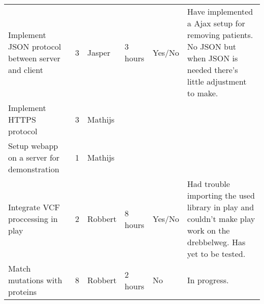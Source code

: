 \documentclass[a4paper]{report}
\begin{document}
\begin{landscape}
\begin{longtable}{p{6cm}|l|l|l|p{2cm}|p{7cm}}
Implement JSON protocol between server and client & 3 & Jasper & 3 hours & Yes/No & Have implemented a Ajax setup for removing patients. No JSON but when JSON is needed there's little adjustment to make.\\
Implement HTTPS protocol & 3 & Mathijs & & & \\
Setup webapp on a server for demonstration & 1 & Mathijs & & & \\
Integrate VCF proccessing in play & 2 & Robbert & 8 hours & Yes/No & Had trouble importing the used library in play and couldn't make play work on the drebbelweg. Has yet to be tested.\\
Match mutations with proteins & 8 & Robbert & 2 hours & No & In progress.\\
\end{longtable}
\end{landscape}
\end{document}
